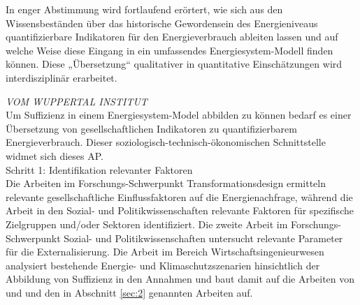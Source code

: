 \documentclass[a4paper,11pt,twoside]{scrartcl}
\begin{document}

In enger Abstimmung wird fortlaufend erörtert, wie sich aus den Wissensbeständen über das historische Gewordensein des Energieniveaus quantifizierbare Indikatoren für den Energieverbrauch ableiten lassen und auf welche Weise diese Eingang in ein umfassendes Energiesystem-Modell finden können. Diese „Übersetzung“ qualitativer in quantitative Einschätzungen wird interdisziplinär erarbeitet.

\textit{VOM WUPPERTAL INSTITUT}\\
Um Suffizienz in einem Energiesystem-Model abbilden zu können bedarf es einer Übersetzung von gesellschaftlichen Indikatoren zu quantifizierbarem Energieverbrauch. Dieser soziologisch-technisch-ökonomischen Schnittstelle widmet sich dieses AP.\\ 
Schritt 1: Identifikation relevanter Faktoren\\
Die Arbeiten im Forschungs-Schwerpunkt Transformationsdesign ermitteln relevante gesellschaftliche Einflussfaktoren auf die Energienachfrage, während die Arbeit in den Sozial- und Politikwissenschaften relevante Faktoren für spezifische Zielgruppen und/oder Sektoren identifiziert. Die zweite Arbeit im Forschungs-Schwerpunkt Sozial- und Politikwissenschaften untersucht relevante Parameter für die Externalisierung. Die Arbeit im Bereich Wirtschaftsingenieurwesen analysiert bestehende Energie- und Klimaschutzszenarien hinsichtlich der Abbildung von Suffizienz in den Annahmen und baut damit auf die Arbeiten von \cite{SAMADI2017} und \cite{UBA2016} und den in Abschnitt \ref{sec:2} genannten Arbeiten auf.
\end{document}
